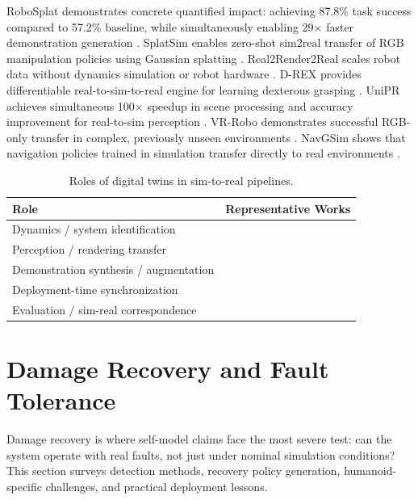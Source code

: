\documentclass[12pt,a4paper,oneside]{report}
\begin{document}
RoboSplat demonstrates concrete quantified impact: achieving 87.8\% task success compared to 57.2\% baseline, while simultaneously enabling 29× faster demonstration generation \cite{yang2025robosplat}. SplatSim enables zero-shot sim2real transfer of RGB manipulation policies using Gaussian splatting \cite{qureshi2025splatsim}. Real2Render2Real scales robot data without dynamics simulation or robot hardware \cite{yu2025real2render2real}. D-REX provides differentiable real-to-sim-to-real engine for learning dexterous grasping \cite{lou2026drex}. UniPR achieves simultaneous 100× speedup in scene processing and accuracy improvement for real-to-sim perception \cite{zhang2025unipr}. VR-Robo demonstrates successful RGB-only transfer in complex, previously unseen environments \cite{zhu2025vrrobo}. NavGSim shows that navigation policies trained in simulation transfer directly to real environments \cite{liu2025navgsim}.

\begin{table}[H]
\centering
\caption{Roles of digital twins in sim-to-real pipelines.}
\label{tab:digital_twin_roles}
\begin{tabular}{p{3.5cm}p{8cm}}
\toprule
\textbf{Role} & \textbf{Representative Works} \\
\midrule
Dynamics / system identification & \cite{tan2018simtoreal, heiden2022inferring, lou2026drex} \\
Perception / rendering transfer & \cite{qureshi2025splatsim, tang2025semantic} \\
Demonstration synthesis / augmentation & \cite{yang2025robosplat, yu2025real2render2real} \\
Deployment-time synchronization & \cite{abou2024realissim} \\
Evaluation / sim-real correspondence & \cite{jain2025polaris, li2024simpler} \\
\bottomrule
\end{tabular}
\end{table}

\section{Damage Recovery and Fault Tolerance}

Damage recovery is where self-model claims face the most severe test: can the system operate with real faults, not just under nominal simulation conditions? This section surveys detection methods, recovery policy generation, humanoid-specific challenges, and practical deployment lessons.
\end{document}
